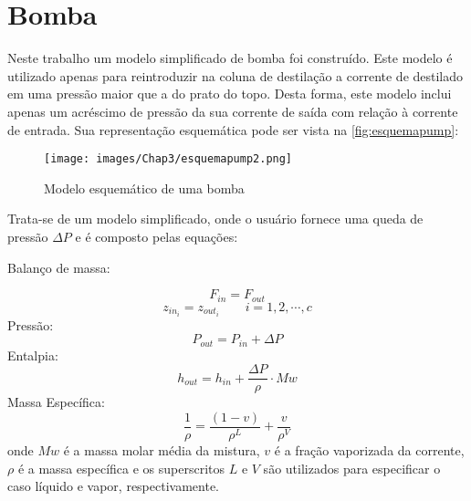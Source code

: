 \section{Bomba} \label{sec:modelobomba}
Neste trabalho um modelo simplificado de bomba foi construído.
Este modelo é utilizado apenas para reintroduzir na coluna de destilação a corrente de destilado em uma pressão maior
que a do prato do topo. Desta forma, este modelo inclui apenas um acréscimo de pressão da sua corrente de saída com
relação à corrente de entrada.
Sua representação esquemática pode ser vista na \autoref{fig:esquemapump}:

\begin{figure}[htb]
\centering \texttt{[image: images/Chap3/esquemapump2.png]}
\caption{Modelo esquemático de uma bomba}
\label{fig:esquemapump}
\end{figure}

Trata-se de um modelo simplificado, onde o usuário fornece uma queda de pressão $\Delta P$ e é composto pelas equações:

\begin{flushleft}
Balanço de massa:
\end{flushleft}
\begin{equation}
F_{in} = F_{out}
\end{equation}
\begin{equation}
z_{in_i} = z_{out_i}  \qquad i=1,2,\cdots,c
\end{equation}
Pressão:
\begin{equation}
P_{out} = P_{in} + \Delta P
\end{equation}
Entalpia:
\begin{equation}
h_{out} = h_{in} + \dfrac{\Delta P}{\rho} \cdot Mw
\end{equation}
Massa Específica:
\begin{equation}
\dfrac{1}{\rho} = \dfrac{(1-v)}{\rho^L} + \dfrac{v}{\rho^V}
\end{equation}
onde $Mw$ é a massa molar média da mistura, $v$ é a fração vaporizada da corrente, $\rho$ é a massa específica e
os superscritos $L$ e $V$ são utilizados para especificar o caso líquido e
vapor, respectivamente.

